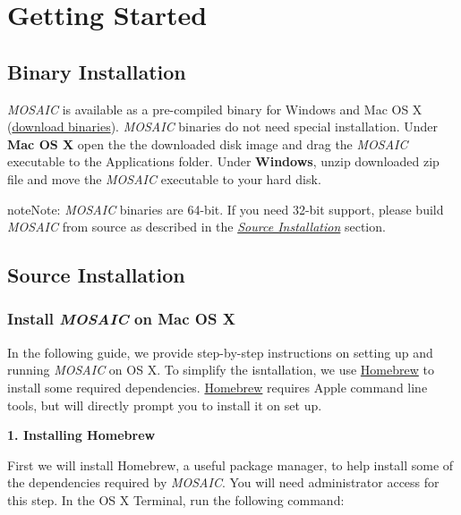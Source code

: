 \documentclass[letterpaper,10pt,english]{sphinxmanual}
\begin{document}
\chapter{Getting Started}
\label{doc/GettingStarted:id29}\label{doc/GettingStarted:gettingstarted}\label{doc/GettingStarted:getting-started}\label{doc/GettingStarted::doc}

\section{Binary Installation}
\label{doc/GettingStarted:binary-installation}
\emph{MOSAIC} is available as a pre-compiled binary for Windows and Mac OS X (\href{http://usnistgov.github.io/mosaic/platforms.html}{download binaries}). \emph{MOSAIC} binaries do not need special installation. Under \textbf{Mac OS X} open the the downloaded disk image and drag the \emph{MOSAIC} executable to the Applications folder. Under \textbf{Windows}, unzip downloaded zip file and move the \emph{MOSAIC} executable to your hard disk.

\begin{notice}{note}{Note:}
\emph{MOSAIC} binaries are 64-bit. If you need 32-bit support, please build \emph{MOSAIC} from source as described in the {\hyperref[doc/GettingStarted:sourceinstall]{\emph{Source Installation}}} section.
\end{notice}


\section{Source Installation}
\label{doc/GettingStarted:source-installation}\label{doc/GettingStarted:sourceinstall}

\subsection{Install \emph{MOSAIC} on Mac OS X}
\label{doc/GettingStarted:install-projname-on-mac-os-x}\label{doc/GettingStarted:installosx}
In the following guide, we provide step-by-step instructions on setting up and running \emph{MOSAIC} on OS X. To simplify the isntallation, we use \href{http://brew.sh/}{Homebrew} to install some required dependencies. \href{http://brew.sh/}{Homebrew}
requires Apple command line tools, but will directly prompt you to install it on set up.

\textbf{1. Installing Homebrew}

First we will install Homebrew, a useful package manager, to help install some of the dependencies required by \emph{MOSAIC}. You will need administrator access for this step. In the OS X Terminal, run the following command:
\end{document}
